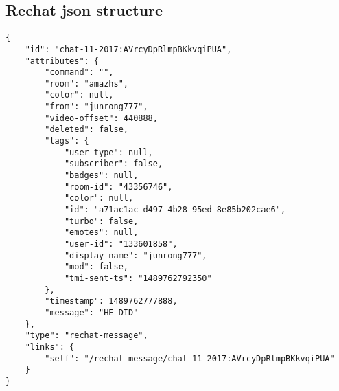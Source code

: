 \documentclass[final]{report} %
\begin{document}
\begin{appendices}
\renewcommand{\chapternumber}{\appendixname\space\thechapter}

\chapter{}\label{app:first-appendix}

\section{Rechat json structure}
\label{json_structure}
\begin{verbatim}
{
	"id": "chat-11-2017:AVrcyDpRlmpBKkvqiPUA",
	"attributes": {
		"command": "",
		"room": "amazhs",
		"color": null,
		"from": "junrong777",
		"video-offset": 440888,
		"deleted": false,
		"tags": {
			"user-type": null,
			"subscriber": false,
			"badges": null,
			"room-id": "43356746",
			"color": null,
			"id": "a71ac1ac-d497-4b28-95ed-8e85b202cae6",
			"turbo": false,
			"emotes": null,
			"user-id": "133601858",
			"display-name": "junrong777",
			"mod": false,
			"tmi-sent-ts": "1489762792350"
		},
		"timestamp": 1489762777888,
		"message": "HE DID"
	},
	"type": "rechat-message",
	"links": {
		"self": "/rechat-message/chat-11-2017:AVrcyDpRlmpBKkvqiPUA"
	}
}
\end{verbatim}



\end{appendices}
\end{document}
